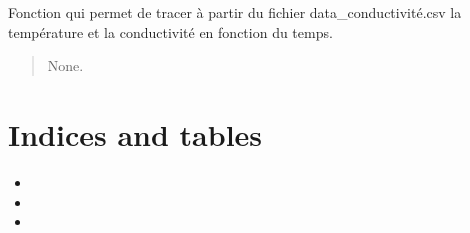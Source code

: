 \documentclass[letterpaper,10pt,french]{sphinxmanual}
\begin{document}
\begin{fulllineitems}
\label{\detokenize{Documentation:ADNI_ProgrammePython.graph_conductimeter}}
\pysigstartsignatures
{}
\pysigstopsignatures
\sphinxAtStartPar
Fonction qui permet de tracer à partir du fichier data\_conductivité.csv la température et la conductivité en fonction du temps.
\begin{quote}\begin{description}
\sphinxAtStartPar
None.

\end{description}\end{quote}

\end{fulllineitems}



\chapter{Indices and tables}
\label{\detokenize{index:indices-and-tables}}\begin{itemize}
\item {} 
\sphinxAtStartPar
{}

\item {} 
\sphinxAtStartPar
{}

\item {} 
\sphinxAtStartPar
{}

\end{itemize}



\renewcommand{\indexname}{Index}
\printindex
\end{document}
